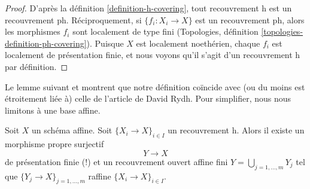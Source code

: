 \begin{proof}
D'après la définition \ref{definition-h-covering}, tout recouvrement h est un recouvrement ph.
Réciproquement, si $\{f_i : X_i \to X\}$ est un recouvrement ph, alors les morphismes
$f_i$ sont localement de type fini (Topologies, définition
\ref{topologies-definition-ph-covering}). Puisque $X$ est localement noethérien,
chaque $f_i$ est localement de présentation finie, et nous voyons qu'il s'agit
d'un recouvrement h par définition.
\end{proof}

\noindent
Le lemme suivant et \cite[théorème 8.4]{rydh_descent}
montrent que notre définition coïncide avec (ou du moins est
étroitement liée à) celle de l'article \cite{rydh_descent}
de David Rydh. Pour simplifier, nous nous limitons à une base affine.

\begin{lemma}
\label{lemma-approximate-h-cover}
Soit $X$ un schéma affine. Soit $\{X_i \to X\}_{i \in I}$
un recouvrement h. Alors il existe un morphisme propre surjectif
$$
Y \longrightarrow X
$$
de présentation finie (!) et un recouvrement ouvert affine fini
$Y = \bigcup_{j = 1, \ldots, m} Y_j$ tel que
$\{Y_j \to X\}_{j = 1, \ldots, m}$ raffine $\{X_i \to X\}_{i \in I}$.
\end{lemma}


